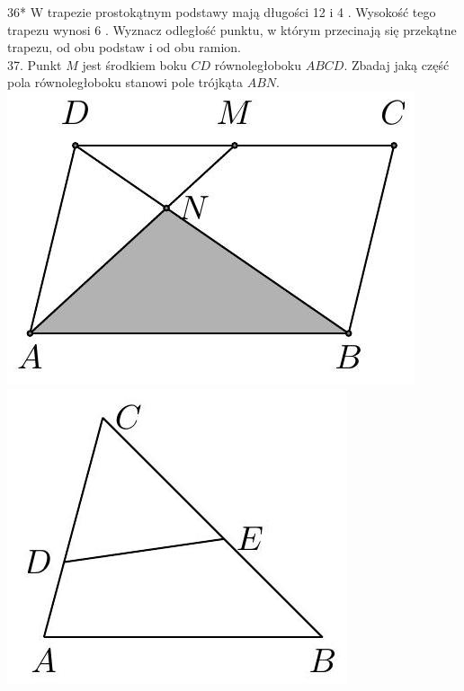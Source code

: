 \documentclass[10pt]{article}
\begin{document}
36* W trapezie prostokątnym podstawy mają długości 12 i 4 . Wysokość tego trapezu wynosi 6 . Wyznacz odległość punktu, w którym przecinają się przekątne trapezu, od obu podstaw i od obu ramion.\\
37. Punkt \(M\) jest środkiem boku \(C D\) równoległoboku \(A B C D\). Zbadaj jaką część pola równoległoboku stanowi pole trójkąta \(A B N\).\\
\includegraphics[max width=\textwidth, center]{2024_11_21_e9b4faa005d5be2cc318g-027(1)}\\
\includegraphics[max width=\textwidth, center]{2024_11_21_e9b4faa005d5be2cc318g-028(1)}\\
\end{document}
